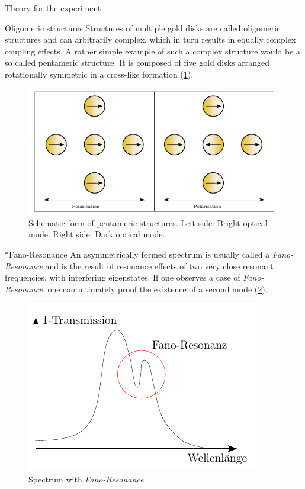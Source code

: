 \documentclass[pdftex, a4paper,11pt, twoside, UKenglish]{report}
\begin{document}
\begin{chapter}{Theory for the experiment}
    
    
    \begin{section}{Oligomeric structures}
      \label{chp:TheoryOligomerics}
      Structures of multiple gold disks are called oligomeric structures and can
      arbitrarily complex, which in turn results in equally complex coupling
      effects. A rather simple example of such a complex structure would be a
      so called pentameric structure. It is composed of five gold disks arranged
      rotationally symmetric in a cross-like formation (\cref{fig:Pentamers}).
      \begin{figure}[ht]
        \centering
        \includegraphics[width=.9\textwidth]{Figures/Pentamers.png}
        \caption{Schematic form of pentameric structures.
            Left side: Bright optical mode. Right side: Dark optical mode.
            \cite{bib:Theorieteil}}
        \label{fig:Pentamers}
      \end{figure}
      
      
      
      \begin{subsection}*{Fano-Resonance}
        An asymmetrically formed spectrum is usually called a
        \textit{Fano-Resonance} and is the result of resonance effects of
        two very close resonant frequencies, with interfering eigenstates.
        If one observes a case of \textit{Fano-Resonance}, one can
        ultimately proof the existence of a second mode (\cref{fig:Fano}).
        \begin{figure}[ht!]
          \centering
          \includegraphics[width=.55\textwidth]{Figures/Fano.png}
          \caption{Spectrum with \textit{Fano-Resonance}.
          \cite{bib:Theorieteil}}
          \label{fig:Fano}
        \end{figure}
      \end{subsection}
      

\end{section}
\end{chapter}
\end{document}
